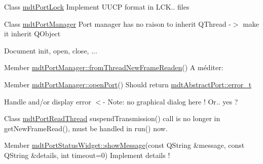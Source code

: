 \begin{DoxyDescription}
\item[Class \hyperlink{classmdt_port_lock}{mdtPortLock} ]Implement UUCP format in LCK.. files 
\end{DoxyDescription}

\label{todo__todo000037}
\hypertarget{todo__todo000037}{}
 
\begin{DoxyDescription}
\item[Class \hyperlink{classmdt_port_manager}{mdtPortManager} ]Port manager has no raison to inherit QThread -\/$>$ make it inherit QObject 

Document init, open, close, ...
\end{DoxyDescription}

\label{todo__todo000036}
\hypertarget{todo__todo000036}{}
 
\begin{DoxyDescription}
\item[Member \hyperlink{classmdt_port_manager_a4fcc8f0699b655156e661bb3de6056cc}{mdtPortManager::fromThreadNewFrameReaden}() ]A méditer: 
\end{DoxyDescription}

\label{todo__todo000039}
\hypertarget{todo__todo000039}{}
 
\begin{DoxyDescription}
\item[Member \hyperlink{classmdt_port_manager_aab594613e8985590c835194efbc27b5e}{mdtPortManager::openPort}() ]Should return \hyperlink{classmdt_abstract_port_ad4121bb930c95887e77f8bafa065a85e}{mdtAbstractPort::error\_\-t} 

Handle and/or display error $<$-\/ Note: no graphical dialog here ! Or.. yes ? 
\end{DoxyDescription}

\label{todo__todo000041}
\hypertarget{todo__todo000041}{}
 
\begin{DoxyDescription}
\item[Class \hyperlink{classmdt_port_read_thread}{mdtPortReadThread} ]suspendTransmission() call is no longer in getNewFrameRead(), must be handled in run() now. 
\end{DoxyDescription}

\label{todo__todo000042}
\hypertarget{todo__todo000042}{}
 
\begin{DoxyDescription}
\item[Member \hyperlink{classmdt_port_status_widget_a8fce28ddb290512f5681cf800ac17b81}{mdtPortStatusWidget::showMessage}(const QString \&message, const QString \&details, int timeout=0) ]Implement details ! 
\end{DoxyDescription}


